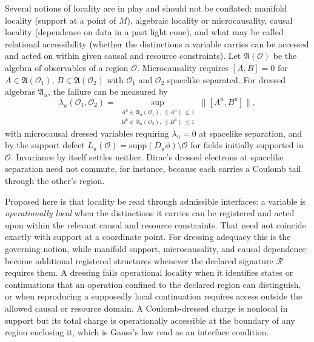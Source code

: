\documentclass[11pt]{article}
\theoremstyle{plain}
\theoremstyle{definition}
\theoremstyle{remark}
\newcommand{\R}{\mathcal R}
\begin{document}
Several notions of locality are in play and should not be conflated: manifold locality (support at a point of $M$), algebraic locality or microcausality, causal locality (dependence on data in a past light cone), and what may be called relational accessibility (whether the distinctions a variable carries can be accessed and acted on within given causal and resource constraints). Let $\mathfrak A(\mathcal O)$ be the algebra of observables of a region $\mathcal O$. Microcausality requires $[A,B]=0$ for $A\in\mathfrak A(\mathcal O_1)$, $B\in\mathfrak A(\mathcal O_2)$ with $\mathcal O_1$ and $\mathcal O_2$ spacelike separated. For dressed algebras $\mathfrak A_u$, the failure can be measured by
\begin{equation}
\lambda_u(\mathcal O_1,\mathcal O_2)=\sup_{\substack{A^u\in\mathfrak A_u(\mathcal O_1),\ \|A^u\|\le1\\ B^u\in\mathfrak A_u(\mathcal O_2),\ \|B^u\|\le1}}\big\|[A^u,B^u]\big\|,
\end{equation}
with microcausal dressed variables requiring $\lambda_u=0$ at spacelike separation, and by the support defect $L_u(\mathcal O)=\mathrm{supp}(D_u\phi)\setminus\mathcal O$ for fields initially supported in $\mathcal O$. Invariance by itself settles neither. Dirac's dressed electrons at spacelike separation need not commute, for instance, because each carries a Coulomb tail through the other's region.

Proposed here is that locality be read through admissible interfaces: a variable is \emph{operationally local} when the distinctions it carries can be registered and acted upon within the relevant causal and resource constraints. That need not coincide exactly with support at a coordinate point. For dressing adequacy this is the governing notion, while manifold support, microcausality, and causal dependence become additional registered structures whenever the declared signature $\R$ requires them. A dressing fails operational locality when it identifies states or continuations that an operation confined to the declared region can distinguish, or when reproducing a supposedly local continuation requires access outside the allowed causal or resource domain. A Coulomb-dressed charge is nonlocal in support but its total charge is operationally accessible at the boundary of any region enclosing it, which is Gauss's law read as an interface condition.
\end{document}
